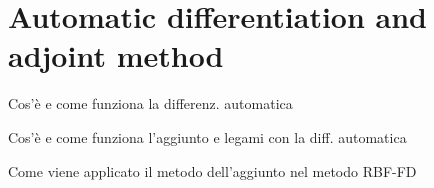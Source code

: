 \chapter{Automatic differentiation and adjoint method}

Cos'è e come funziona la differenz. automatica

Cos'è e come funziona l'aggiunto e legami con la diff. automatica

Come viene applicato il metodo dell'aggiunto nel metodo RBF-FD
